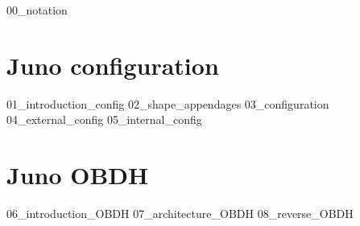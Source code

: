 {00_notation}
\pagebreak
{}

\section{Juno configuration}
\label{sec:juno_config}

{01_introduction_config}
{02_shape_appendages}
{03_configuration}
{04_external_config}
{05_internal_config}

\pagebreak

\section{Juno OBDH}
\label{sec:juno_OBDH}

{06_introduction_OBDH}
{07_architecture_OBDH}
{08_reverse_OBDH}